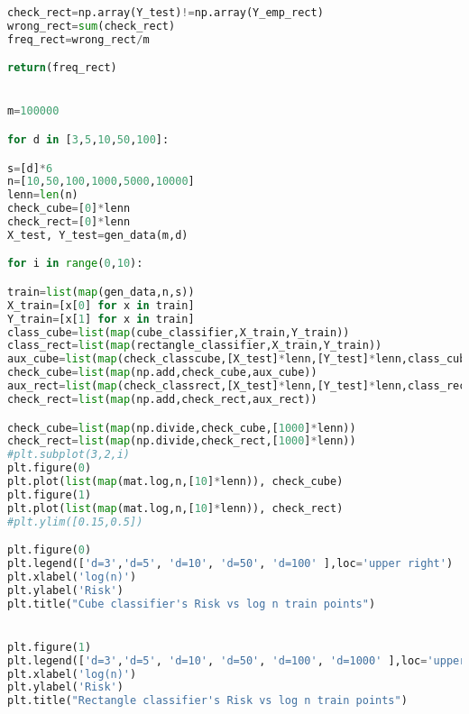 \documentclass[11pt, english]{article}
\begin{document}
\begin{lstlisting}[language=Python]
check_rect=np.array(Y_test)!=np.array(Y_emp_rect)
wrong_rect=sum(check_rect)
freq_rect=wrong_rect/m

return(freq_rect)


m=100000

for d in [3,5,10,50,100]:

s=[d]*6
n=[10,50,100,1000,5000,10000]
lenn=len(n)    
check_cube=[0]*lenn
check_rect=[0]*lenn
X_test, Y_test=gen_data(m,d)    

for i in range(0,10):

train=list(map(gen_data,n,s))
X_train=[x[0] for x in train]
Y_train=[x[1] for x in train]
class_cube=list(map(cube_classifier,X_train,Y_train))
class_rect=list(map(rectangle_classifier,X_train,Y_train))
aux_cube=list(map(check_classcube,[X_test]*lenn,[Y_test]*lenn,class_cube))
check_cube=list(map(np.add,check_cube,aux_cube))
aux_rect=list(map(check_classrect,[X_test]*lenn,[Y_test]*lenn,class_rect))
check_rect=list(map(np.add,check_rect,aux_rect))

check_cube=list(map(np.divide,check_cube,[1000]*lenn))
check_rect=list(map(np.divide,check_rect,[1000]*lenn))
#plt.subplot(3,2,i)    
plt.figure(0)    
plt.plot(list(map(mat.log,n,[10]*lenn)), check_cube)
plt.figure(1)    
plt.plot(list(map(mat.log,n,[10]*lenn)), check_rect)
#plt.ylim([0.15,0.5])

plt.figure(0)
plt.legend(['d=3','d=5', 'd=10', 'd=50', 'd=100' ],loc='upper right')
plt.xlabel('log(n)')
plt.ylabel('Risk')
plt.title("Cube classifier's Risk vs log n train points")


plt.figure(1)
plt.legend(['d=3','d=5', 'd=10', 'd=50', 'd=100', 'd=1000' ],loc='upper right')
plt.xlabel('log(n)')
plt.ylabel('Risk')
plt.title("Rectangle classifier's Risk vs log n train points")

\end{lstlisting}
\end{document}
